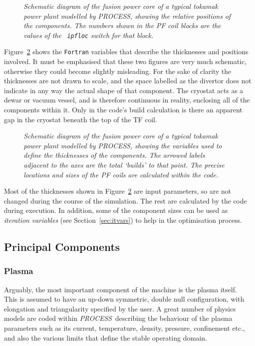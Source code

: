 \documentclass[11pt,a4paper]{report}
\newcommand{\PS}{\mbox{\it PROCESS\/ }}
\newcommand{\PSC}{\mbox{\it PROCESS},\/ }
\begin{document}
\begin{figure}
\centerline{}
\vspace{-12mm}
\caption[build1] {\it Schematic diagram of the fusion power core of a typical
tokamak power plant modelled by \PSC showing the relative positions of the
components. The numbers shown in the PF coil blocks are the values of the {\tt
ipfloc} switch for that block.}
\label{fig:build1}
\end{figure}

Figure~\ref{fig:build2} shows the \texttt{Fortran} variables that describe the
thicknesses and positions involved. It must be emphasised that these two
figures are very much schematic, otherwise they could become slightly
misleading. For the sake of clarity the thicknesses are not drawn to scale,
and the space labelled as the divertor does not indicate in any way the actual
shape of that component. The cryostat acts as a dewar or vacuum vessel, and is
therefore continuous in reality, enclosing all of the components within
it. Only in the code's build calculation is there an apparent gap in the
cryostat beneath the top of the TF coil.

\begin{figure}
\centerline{}
\vspace{-12mm}
\caption[build2] {\it Schematic diagram of the fusion power core of a typical
tokamak power plant modelled by \PSC showing the variables used to define the
thicknesses of the components. The arrowed labels adjacent to the axes are the
total `builds' to that point. The precise locations and sizes of the PF coils
are calculated within the code.}
\label{fig:build2}
\end{figure}

Most of the thicknesses shown in Figure~\ref{fig:build2} are input parameters,
so are not changed during the course of the simulation.  The rest are
calculated by the code during execution. In addition, some of the component
sizes can be used as {\it iteration variables}\/ (see
Section~\ref{sec:itvars}) to help in the optimisation process.

\subsection{Principal Components}

\subsubsection{Plasma}
Arguably, the most important component of the machine is the plasma
itself. This is assumed to have an up-down symmetric, double null
configuration, with elongation and triangularity specified by the user. A
great number of physics models are coded within \PS describing the behaviour
of the plasma parameters such as its current, temperature, density, pressure,
confinement etc., and also the various limits that define the stable operating
domain.
\end{document}
